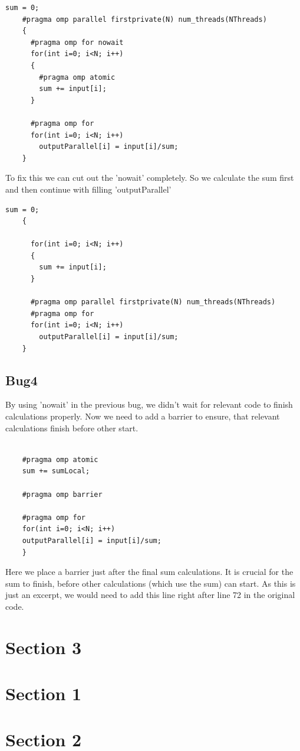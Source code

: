 \documentclass{article}
\begin{document}
\begin{lstlisting}[caption=Step 2]
    sum = 0;
    #pragma omp parallel firstprivate(N) num_threads(NThreads)
    {
      #pragma omp for nowait
      for(int i=0; i<N; i++)
      {
        #pragma omp atomic
        sum += input[i];
      }
  
      #pragma omp for 
      for(int i=0; i<N; i++)
        outputParallel[i] = input[i]/sum;
    }
\end{lstlisting}
To fix this we can cut out the 'nowait' completely.
So we calculate the sum first and then continue with filling 'outputParallel'
\begin{lstlisting}[caption=Step 2]
    sum = 0;
    {
  
      for(int i=0; i<N; i++)
      {
        sum += input[i];
      }
      
      #pragma omp parallel firstprivate(N) num_threads(NThreads)
      #pragma omp for 
      for(int i=0; i<N; i++)
        outputParallel[i] = input[i]/sum;
    }
\end{lstlisting}
\subsection*{Bug4}
By using 'nowait' in the previous bug, we didn't wait for relevant code to finish calculations properly.
Now we need to add a barrier to ensure, that relevant calculations finish before other start.
\begin{lstlisting}[caption=Step 2]

    #pragma omp atomic
    sum += sumLocal;
    
    #pragma omp barrier
    
    #pragma omp for
    for(int i=0; i<N; i++)
    outputParallel[i] = input[i]/sum;
    }
\end{lstlisting}
Here we place a barrier just after the final sum calculations.
It is crucial for the sum to finish, before other calculations (which use the sum) can start.
As this is just an excerpt, we would need to add this line right after line 72 in the original code.

\section*{Section 3}
\section*{Section 1}
\section*{Section 2}
\end{document}

